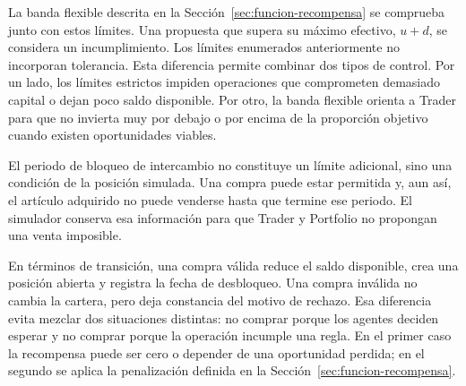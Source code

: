 La banda flexible descrita en la Sección~\ref{sec:funcion-recompensa} se comprueba junto con estos límites. Una propuesta que supera su máximo efectivo, $u+d$, se considera un incumplimiento. Los límites enumerados anteriormente no incorporan tolerancia. Esta diferencia permite combinar dos tipos de control. Por un lado, los límites estrictos impiden operaciones que comprometen demasiado capital o dejan poco saldo disponible. Por otro, la banda flexible orienta a Trader para que no invierta muy por debajo o por encima de la proporción objetivo cuando existen oportunidades viables.

El periodo de bloqueo de intercambio no constituye un límite adicional, sino una condición de la posición simulada. Una compra puede estar permitida y, aun así, el artículo adquirido no puede venderse hasta que termine ese periodo. El simulador conserva esa información para que Trader y Portfolio no propongan una venta imposible.

En términos de transición, una compra válida reduce el saldo disponible, crea una posición abierta y registra la fecha de desbloqueo. Una compra inválida no cambia la cartera, pero deja constancia del motivo de rechazo. Esa diferencia evita mezclar dos situaciones distintas: no comprar porque los agentes deciden esperar y no comprar porque la operación incumple una regla. En el primer caso la recompensa puede ser cero o depender de una oportunidad perdida; en el segundo se aplica la penalización definida en la Sección~\ref{sec:funcion-recompensa}.

